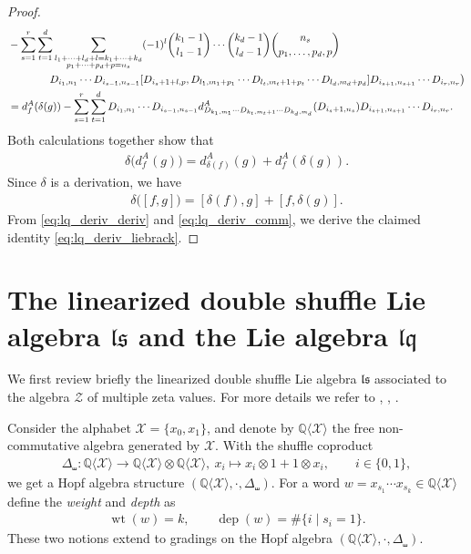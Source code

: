 \documentclass[12pt,reqno]{amsart}
\numberwithin{equation}{section}
\theoremstyle{definition}
\newcommand{\QQ}{\mathbb{Q}}
\newcommand{\Z}{\mathcal{Z}}
\newcommand{\wt}{\operatorname{wt}}
\newcommand{\dep}{\operatorname{dep}}
\newcommand{\X}{\mathcal{X}}
\newcommand{\QX}{\QQ\langle \X\rangle}
\newcommand{\ls}{\mathfrak{ls}}
\newcommand{\lqq}{\mathfrak{lq}}
\newcommand{\der}[1]{d_{#1}^A}
\newcommand{\shco}{\Delta_{\shuffle}}
\begin{document}
\begin{proof}
\begin{align*}
&-\sum_{s=1}^r \sum_{t=1}^d\sum_{\substack{l_1+\cdots+l_d+l=k_1+\cdots+k_d \\ p_1+\cdots+p_d+p=n_s}} (-1)^l\binom{k_1-1}{l_1-1}\cdots \binom{k_d-1}{l_d-1} \binom{n_s}{p_1,\ldots,p_d,p}\\ 
&\hspace{1.4cm} D_{i_1,n_1}\cdots D_{i_{s-1},n_{s-1}}[D_{i_s+1+l,p},D_{l_1,m_1+p_1}\cdots D_{l_t,m_t+1+p_t}\cdots D_{l_d,m_d+p_d}]D_{i_{s+1},n_{s+1}}\cdots D_{i_r,n_r}\big)\\
&=\der{f}(\delta(g))-\sum_{s=1}^r \sum_{t=1}^d D_{i_1,n_1}\cdots D_{i_{s-1},n_{s-1}}\der{D_{k_1,m_1}\cdots D_{k_t,m_t+1}\cdots D_{k_d,m_d}}(D_{i_s+1,n_s})D_{i_{s+1},n_{s+1}}\cdots D_{i_r,n_r}.
\end{align*}
Both calculations together show that
\begin{align} \label{eq:lq_deriv_deriv}
\delta\big(\der{f}(g)\big)=\der{\delta(f)}(g)+\der{f}(\delta(g)).
\end{align}
Since $\delta$ is a derivation, we have
\begin{align} \label{eq:lq_deriv_comm}
\delta\big([f,g]\big)=[\delta(f),g]+[f,\delta(g)].
\end{align}
From \eqref{eq:lq_deriv_deriv} and \eqref{eq:lq_deriv_comm}, we derive the claimed identity \eqref{eq:lq_deriv_liebrack}.
\end{proof}


\section{The linearized double shuffle Lie algebra $\ls$ and the Lie algebra $\lqq$} \label{sec:ls_and_lq}

We first review  briefly the linearized double shuffle Lie algebra $\ls$ associated to the algebra $\Z$ of multiple zeta values. For more details we refer to \cite{Bro21}, \cite{IKZ06}, \cite{Sc15}.

\vspace{0.3cm}
Consider the alphabet $\X=\{x_0,x_1\}$, and denote by $\QX$ the free non-commutative algebra generated by $\X$. With the shuffle coproduct \begin{align} \label{eq:shco_QX}
\shco:\QX\to \QX\otimes\QX,\ x_i\mapsto x_i\otimes 1 +1 \otimes x_i, \qquad i\in\{0,1\},
\end{align}
we get a Hopf algebra structure $(\QX,\cdot,\shco)$. For a word $w=x_{s_1}\cdots x_{s_k}\in \QX$ define the \emph{weight} and \emph{depth} as
\begin{align*}
\wt(w)=k,\qquad \dep(w)=\#\{i\mid s_i=1\}.
\end{align*}
These two notions extend to gradings on the Hopf algebra $(\QX,\cdot,\shco)$.
\end{document}
